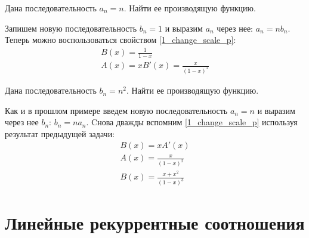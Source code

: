 \begin{task}
    Дана последовательность $a_n = n$. Найти ее производящую функцию.
    \begin{solution}
        Запишем новую последовательность $b_n = 1$ и выразим $a_n$ через нее: $a_n = n b_n$.
        Теперь можно воспользоваться свойством \ref{1_change_scale_p}:
        \begin{gather*}
            B(x) = \frac{1}{1-x} \\
            A(x) = xB'(x) = \frac{x}{(1-x)^2}
        \end{gather*}
    \end{solution}
\end{task}

\begin{task}
    Дана последовательность $b_n = n^2$. Найти ее производящую функцию.
    \begin{solution}
        Как и в прошлом примере введем новую последовательность $a_n = n$ и выразим через нее
        $b_n$: $b_n = na_n$. Cнова дважды вспомним \ref{1_change_scale_p} используя результат
        предыдущей задачи:
        \begin{gather*}
            B(x) = xA'(x) \\
            A(x) = \frac{x}{(1 - x)^2} \\
            B(x) = \frac{x + x^2}{(1 - x)^3}
        \end{gather*}
    \end{solution}
\end{task}

\section{Линейные рекуррентные соотношения}
